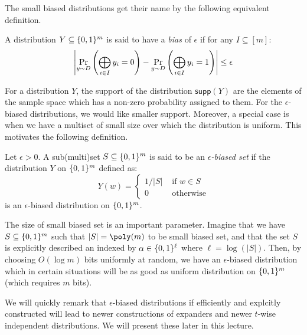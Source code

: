 \noindent The small biased distributions get their name by the following equivalent definition.

\begin{definition}
A distribution $Y \subseteq \{0,1\}^m$ is said to have a \textit{bias} of $\epsilon$ if for any $I \subseteq [m]$:
$$\left| \Pr_{y \sim D}\left( \bigoplus_{i \in I} y_i = 0 \right) - \Pr_{y \sim D}\left( \bigoplus_{i \in I} y_i = 1 \right) \right| \le \epsilon$$
\end{definition}



\noindent For a distribution $Y$, the support of the distribution $\mathsf{supp}(Y)$ are the elements of the sample space which has a non-zero probability assigned to them. For the $\epsilon$-biased distributions, we would like smaller support. Moreover, a special case is when we have a multiset of small size over which the distribution is uniform. This motivates the following definition.

\begin{definition}
Let $\epsilon > 0$.
A sub(multi)set $S \subseteq \{0,1\}^m$ is said to be an \textit{$\epsilon$-biased set} if the distribution $Y$ on $\{0,1\}^m$ defined as:
\[
Y(w) = \left\{
\begin{array}{ll}
1/|S| & \textrm{ if $w \in S$} \\
0 & \textrm{ otherwise}
\end{array}
\right.
\]
is an $\epsilon$-biased distribution on $\{0,1\}^m$.
\end{definition}

\noindent The size of small biased set is an important parameter. Imagine that we have $S \subseteq \{0,1\}^m$ such that $|S| = \poly(m)$ to be small biased set, and that the set $S$ is explicitly described an indexed by $\alpha \in \{0,1\}^\ell$ where $\ell = \log(|S|)$. Then, by choosing $O(\log m)$ bits uniformly at random, we have an $\epsilon$-biased distribution  which in certain situations will be as good as uniform distribution on $\{0,1\}^m$ (which requires $m$ bits).

We will quickly remark that $\epsilon$-biased distributions if efficiently and explcitly constructed will lead to newer constructions of expanders and newer $t$-wise independent distributions. We will present these later in this lecture.

